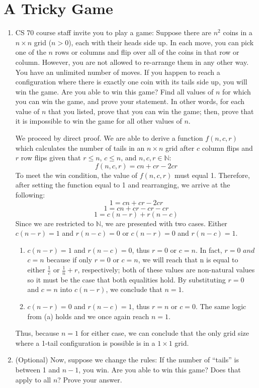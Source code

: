 \documentclass[11pt]{article}
\newcommand*{\Question}[1]{\vfill\pagebreak[3]\section{#1}}
\newenvironment{Parts}{\begin{enumerate}[label=(\alph*)]}{\end{enumerate}}
\newcommand*{\Part}{\item}
\newenvironment{Answer}{\vspace{20pt}}{\vspace{20pt}}
\newcommand*{\N}{\mathbb{N}}
\begin{document}
\clearpage 

\Question{A Tricky Game}

\begin{Parts}
\Part CS 70 course staff invite you to play a game: Suppose there are $n^2$ coins in a $n\times n$ grid ($n > 0$), each with their heads side up. In each move, you can pick one of the $n$ rows or columns and flip over all of the coins in that row or column. However, you are not allowed to re-arrange them in any other way. You have an unlimited number of moves. If you happen to reach a configuration where there is exactly one coin with its tails side up, you will win the game. Are you able to win this game? Find all values of $n$ for which you can win the game, and prove your statement. In other words, for each value of $n$ that you listed, prove that you can win the game; then, prove that it is impossible to win the game for all other values of $n$.

\begin{Answer}
We proceed by direct proof. We are able to derive a function $f(n,c,r)$ which calculates the number of tails in an $n \times n$ grid after $c$ column flips and $r$ row flips given that $r \leq n$, $c \leq n$, and $n,c,r\in \N$: $$f(n,c,r)=cn+cr-2cr$$ To meet the win condition, the value of $f(n,c,r)$ must equal 1. Therefore, after setting the function equal to 1 and rearranging, we arrive at the following: $$1=cn+cr-2cr$$ $$1=cn+cr-cr-cr$$ $$1=c(n-r)+r(n-c)$$ Since we are restricted to $\N$, we are presented with two cases. Either $c(n-r)=1$ and $r(n-c)=0$ or $c(n-r)=0$ and $r(n-c)=1$. 
\begin{enumerate}
\item $c(n-r)=1$ and $r(n-c)=0$, thus $r=0$ or $c=n$. In fact, $r=0$ $and$ $c=n$ because if only $r=0$ or $c=n$, we will reach that n is equal to either $\frac{1}{c}$ or $\frac {1}{n}+r$, respectively; both of these values are non-natural values so it must be the case that both equalities hold. By substituting $r=0$ and $c=n$ into $c(n-r)$, we conclude that $n=1$.
\item $c(n-r)=0$ and $r(n-c)=1$, thus $r=n$ or $c=0$. The same logic from (a) holds and we once again reach $n=1$. 
\end{enumerate} Thus, because $n=1$ for either case, we can conclude that the only grid size where a 1-tail configuration is possible is in a $1 \times 1$ grid.

\end{Answer}

\Part (Optional) Now, suppose we change the rules: If the number of ``tails'' is between 1 and $n-1$, you win. Are you able to win this game? Does that apply to all $n$? Prove your answer.

\begin{Answer}


\end{Answer}

\end{Parts}
\end{document}
